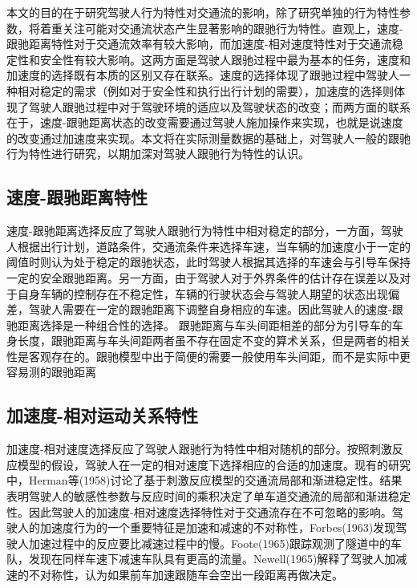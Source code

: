 本文的目的在于研究驾驶人行为特性对交通流的影响，除了研究单独的行为特性参数，将着重关注可能对交通流状态产生显著影响的跟驰行为特性。直观上，速度-跟驰距离特性对于交通流效率有较大影响，而加速度-相对速度特性对于交通流稳定性和安全性有较大影响。这两方面是驾驶人跟驰过程中最为基本的任务，速度和加速度的选择既有本质的区别又存在联系。速度的选择体现了跟驰过程中驾驶人一种相对稳定的需求（例如对于安全性和执行出行计划的需要），加速度的选择则体现了驾驶人跟驰过程中对于驾驶环境的适应以及驾驶状态的改变；而两方面的联系在于，速度-跟驰距离状态的改变需要通过驾驶人施加操作来实现，也就是说速度的改变通过加速度来实现。本文将在实际测量数据的基础上，对驾驶人一般的跟驰行为特性进行研究，以期加深对驾驶人跟驰行为特性的认识。

\subsection{速度-跟驰距离特性}
速度-跟驰距离选择反应了驾驶人跟驰行为特性中相对稳定的部分，一方面，驾驶人根据出行计划，道路条件，交通流条件来选择车速，当车辆的加速度小于一定的阈值时则认为处于稳定的跟驰状态，此时驾驶人根据其选择的车速会与引导车保持一定的安全跟驰距离。另一方面，由于驾驶人对于外界条件的估计存在误差以及对于自身车辆的控制存在不稳定性，车辆的行驶状态会与驾驶人期望的状态出现偏差，驾驶人需要在一定的跟驰距离下调整自身相应的车速。因此驾驶人的速度-跟驰距离选择是一种组合性的选择。
跟驰距离与车头间距相差的部分为引导车的车身长度，跟驰距离与车头间距两者虽不存在固定不变的算术关系，但是两者的相关性是客观存在的。跟驰模型中出于简便的需要一般使用车头间距，而不是实际中更容易测的跟驰距离
%

\subsection{加速度-相对运动关系特性}
加速度-相对速度选择反应了驾驶人跟驰行为特性中相对随机的部分。按照刺激反应模型的假设，驾驶人在一定的相对速度下选择相应的合适的加速度。现有的研究中，Herman等(1958)讨论了基于刺激反应模型的交通流局部和渐进稳定性\cite{Herman1959}。结果表明驾驶人的敏感性参数与反应时间的乘积决定了单车道交通流的局部和渐进稳定性。因此驾驶人的加速度-相对速度选择特性对于交通流存在不可忽略的影响。驾驶人的加速度行为的一个重要特征是加速和减速的不对称性，Forbes(1963)发现驾驶人加速过程中的反应要比减速过程中的慢\cite{Forbes1963}。Foote(1965)跟踪观测了隧道中的车队，发现在同样车速下减速车队具有更高的流量\cite{Foote1965}。Newell(1965)解释了驾驶人加减速的不对称性，认为如果前车加速跟随车会空出一段距离再做决定\cite{Newell1965}。

